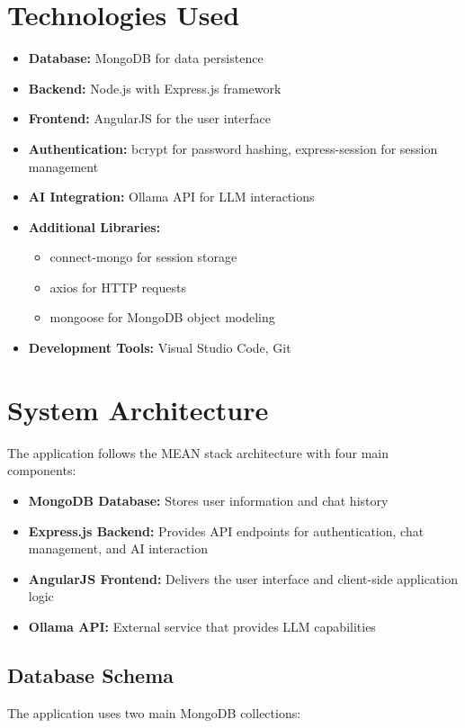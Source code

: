 \documentclass[12pt,a4paper]{article}
\begin{document}
\section{Technologies Used}
\begin{itemize}
\item \textbf{Database:} MongoDB for data persistence
\item \textbf{Backend:} Node.js with Express.js framework
\item \textbf{Frontend:} AngularJS for the user interface
\item \textbf{Authentication:} bcrypt for password hashing, express-session for session management
\item \textbf{AI Integration:} Ollama API for LLM interactions
\item \textbf{Additional Libraries:}
  \begin{itemize}
    \item connect-mongo for session storage
    \item axios for HTTP requests
    \item mongoose for MongoDB object modeling
  \end{itemize}
\item \textbf{Development Tools:} Visual Studio Code, Git
\end{itemize}

\section{System Architecture}
The application follows the MEAN stack architecture with four main components:
\begin{itemize}
\item \textbf{MongoDB Database:} Stores user information and chat history
\item \textbf{Express.js Backend:} Provides API endpoints for authentication, chat management, and AI interaction
\item \textbf{AngularJS Frontend:} Delivers the user interface and client-side application logic
\item \textbf{Ollama API:} External service that provides LLM capabilities
\end{itemize}

\subsection{Database Schema}
The application uses two main MongoDB collections:
\end{document}
